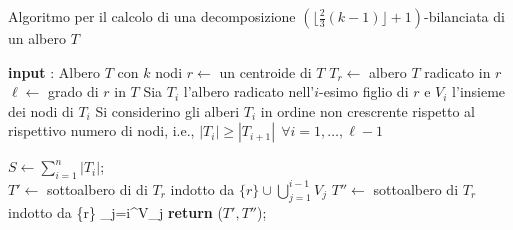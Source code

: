 \begin{algorithm}[H]
	\label{algoritmo1}
	\SetAlgoLined
	\caption{Algoritmo per il calcolo di una decomposizione $ (\lfloor \frac{2}{3}(k-1) \rfloor + 1)$-bilanciata di un albero $T$ }
	\textbf{input} : Albero $ T $ con $ k $ nodi\;
	$r \gets $ un centroide di $T$\;
	$T_r \gets $ albero $T$ radicato in $r$\;
	$\ell \gets$ grado di $r$ in $T$\; 
	Sia $T_i$ l'albero radicato nell'$ i $-esimo figlio di $ r $ e $V_i$ l'insieme dei nodi di $T_i$ \;
	Si considerino gli alberi $T_i$ in ordine non crescrente rispetto al rispettivo numero di nodi, i.e., $ |T_{i}|\ge |T_{i+1}| \ \ \forall {i = 1,\dots, \ell-1} $\;
	
	$ S \gets \sum_{i=1}^{n}|T_i| $;\\
	{
		{
			$ T'\gets $ sottoalbero di  di $ T_r $ indotto da $ \{r\} \cup \bigcup_{j=1}^{i-1} V_j$\; %
			$ T'' \gets $ sottoalbero di $ T_r $ indotto da \{r\} \cup \bigcup_{j=i}^\ell V_j\;
			\textbf{return} ($ T',T'' $);\;
		}	 
}
\end{algorithm}



